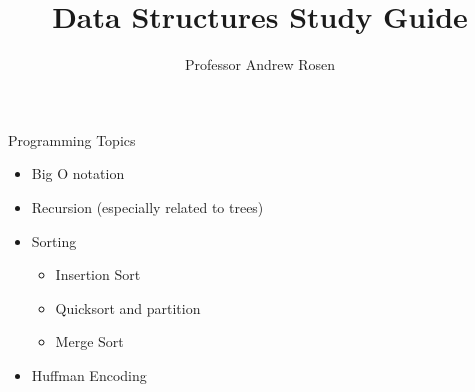 \documentclass[]{article}
\title{Data Structures Study Guide}
\author{Professor Andrew Rosen}
\begin{document}
\maketitle

Programming Topics
\begin{itemize}
	\item Big O notation
	\item Recursion (especially related to trees)
	\item Sorting
	\begin{itemize}
		\item Insertion Sort
		\item Quicksort and partition
		\item Merge Sort
	\end{itemize}
	\item Huffman Encoding
\end{itemize}
\end{document}
